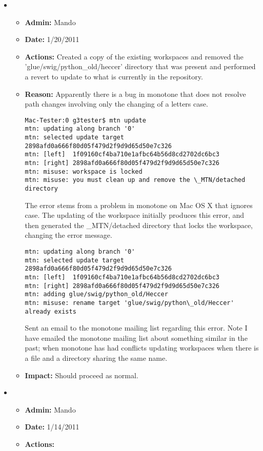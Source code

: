 \documentclass[12pt]{article}
\begin{document}
\begin{itemize}
\item 
\begin{itemize}
\item[] {\bf Admin:} Mando
\item[] {\bf Date:} 1/20/2011
\item[] {\bf Actions:} Created a copy of the existing workspaces and removed the 'glue/swig/python\_old/heccer' directory that was present and performed a revert to update to what is currently in the repository.
\item[] {\bf Reason:}  Apparently there is a bug in monotone that does not resolve path changes involving only the changing of a letters case.

\begin{verbatim}
Mac-Tester:0 g3tester$ mtn update
mtn: updating along branch '0'
mtn: selected update target 2898afd0a666f80d05f479d2f9d9d65d50e7c326
mtn: [left]  1f09160cf4ba710e1afbc64b56d8cd2702dc6bc3
mtn: [right] 2898afd0a666f80d05f479d2f9d9d65d50e7c326
mtn: misuse: workspace is locked
mtn: misuse: you must clean up and remove the \_MTN/detached directory
\end{verbatim}

The error stems from a problem in monotone on Mac OS X that ignores case.  The updating of the workspace initially produces this error, and then generated the \_MTN/detached directory that locks the workspace, changing the error message.

\begin{verbatim}
mtn: updating along branch '0'
mtn: selected update target 2898afd0a666f80d05f479d2f9d9d65d50e7c326
mtn: [left]  1f09160cf4ba710e1afbc64b56d8cd2702dc6bc3
mtn: [right] 2898afd0a666f80d05f479d2f9d9d65d50e7c326
mtn: adding glue/swig/python_old/Heccer
mtn: misuse: rename target 'glue/swig/python\_old/Heccer' already exists
\end{verbatim}

Sent an email to the monotone mailing list regarding this error. Note I have emailed the monotone mailing list about something similar in the past; when monotone has had conflicts updating workspaces when there is a file and a directory sharing the same name. 

\item[] {\bf Impact:}  Should proceed as normal.
\end{itemize}


\item 
\begin{itemize}
\item[] {\bf Admin:} Mando
\item[] {\bf Date:} 1/14/2011
\item[] {\bf Actions:} 



\end{itemize}
\end{itemize}
\end{document}
